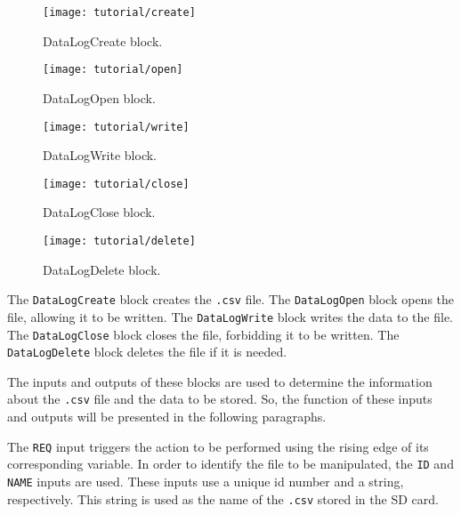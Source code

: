 \begin{figure}[H] \centering
\begin{minipage}{.45\textwidth}
  \centering
 \texttt{[image: tutorial/create]}
  \caption{DataLogCreate block.}
  \label{fig:datalogcreate}
\end{minipage}
% 
\begin{minipage}{.45\textwidth}
  \centering
 \texttt{[image: tutorial/open]}
\caption{DataLogOpen block.}
  \label{fig:datalogopen}
\end{minipage}
\end{figure}

\begin{figure}[H] \centering
\begin{minipage}{.45\textwidth}
  \centering
	\texttt{[image: tutorial/write]}
	\caption{DataLogWrite block.}
	\label{fig:datalogwrite}
\end{minipage}
% 
\begin{minipage}{.45\textwidth}
  \centering
 \texttt{[image: tutorial/close]}
  \caption{DataLogClose block.}
  \label{fig:datalogclose}
\end{minipage}
\end{figure}


\begin{figure}[H] \centering
\begin{minipage}{.45\textwidth}
  \centering
 \texttt{[image: tutorial/delete]}
  \caption{DataLogDelete block.}
  \label{fig:datalogdelete}
\end{minipage}
\end{figure}

The \texttt{DataLogCreate} block creates the \texttt{.csv} file.
The \texttt{DataLogOpen} block opens the file, allowing it to be written.
The \texttt{DataLogWrite} block writes the data to the file.
The \texttt{DataLogClose} block closes the file, forbidding it to be
written. The \texttt{DataLogDelete} block deletes the file if it is needed.

The inputs and outputs of these blocks are used to determine the information
about the \verb|.csv| file and the data to be stored.
So, the function
of these inputs and
outputs will be presented in the following paragraphs.

The \verb|REQ| input triggers the action to be performed using the rising edge
of its corresponding variable.
In order to identify the file to be manipulated, the \verb|ID| and \verb|NAME|
inputs are used. These inputs use a unique id number and a string, respectively. This string is used as the name of the
\verb|.csv| stored in the SD card.

